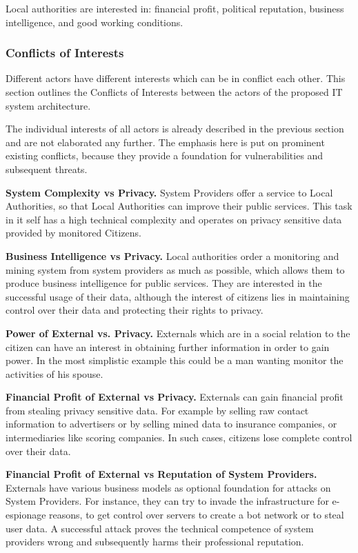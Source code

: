 \documentclass[runningheads,a4paper]{llncs}
\begin{document}
Local authorities are interested in: financial profit, political reputation, business intelligence, and good working conditions.


\subsubsection{Conflicts of Interests}
\label{subsubsection:Conflicts of Interests}
Different actors have different interests which can be in conflict each other. This section outlines the Conflicts of Interests between the actors of the proposed IT system architecture.

The individual interests of all actors is already described in the previous section and are not elaborated any further. The emphasis here is put on prominent existing conflicts, because they provide a foundation for vulnerabilities and subsequent threats.

\textbf{System Complexity vs Privacy.}
System Providers offer a service to Local Authorities, so that Local Authorities can improve their public services. This task in it self has a high technical complexity and operates on privacy sensitive data provided by monitored Citizens.

\textbf{Business Intelligence vs Privacy.}
Local authorities order a monitoring and mining system from system providers as much as possible, which allows them to produce business intelligence for public services. They are interested in the successful usage of their data, although the interest of citizens lies in maintaining control over their data and protecting their rights to privacy.

\textbf{Power of External vs. Privacy.}
Externals which are in a social relation to the citizen can have an interest in obtaining further information in order to gain power. In the most simplistic example this could be a man wanting monitor the activities of his spouse.


\textbf{Financial Profit of External vs Privacy.}
Externals can gain financial profit from stealing privacy sensitive data.
For example by selling raw contact information to advertisers or by selling mined data to insurance companies, or intermediaries like scoring companies. In such cases, citizens lose complete control over their data.


\textbf{Financial Profit of External vs Reputation of System Providers.}
Externals have various business models as optional foundation for attacks on System Providers.
For instance, they can try to invade the infrastructure for e-espionage reasons, to get control over servers to create a bot network or to steal user data. A successful attack proves the technical competence of system providers wrong and subsequently harms their professional reputation.
\end{document}

